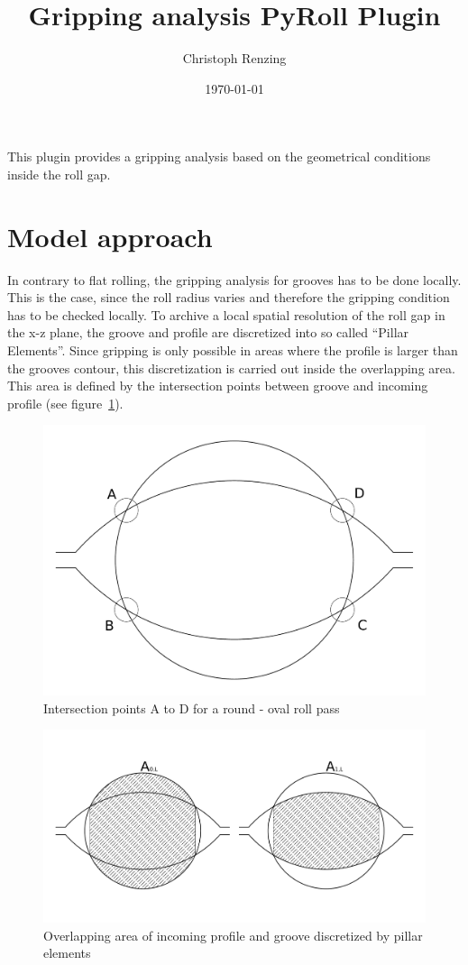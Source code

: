 \documentclass[11pt]{PyRollDocs}
\begin{document}
    \title{Gripping analysis PyRoll Plugin}
    \author{Christoph Renzing}
    \date{\today}

    \maketitle

    This plugin provides a gripping analysis based on the geometrical conditions inside the roll gap.


    \section{Model approach}\label{sec:model-approach}

    In contrary to flat rolling, the gripping analysis for grooves has to be done locally.
    This is the case, since the roll radius varies and therefore the gripping condition has to be checked locally.
    To archive a local spatial resolution of the roll gap in the x-z plane, the groove and profile are discretized into so called \enquote{Pillar Elements}.
    Since gripping is only possible in areas where the profile is larger than the grooves contour, this discretization is carried out inside the overlapping area.
    This area is defined by the intersection points between groove and incoming profile (see figure~\ref{fig:overlapping-intersection-points}).

    \begin{figure}
        \centering
        \includegraphics[width=.7\linewidth]{img/intersection_points}
        \caption{Intersection points A to D for a round - oval roll pass}
        \label{fig:overlapping-intersection-points}
    \end{figure}

    \begin{figure}
        \centering
        \includegraphics[width=.7\linewidth]{img/overlapping-area}
        \caption{Overlapping area of incoming profile and groove discretized by pillar elements}
        \label{fig:roll-gap-profile-with-pillars}
    \end{figure}
\end{document}
